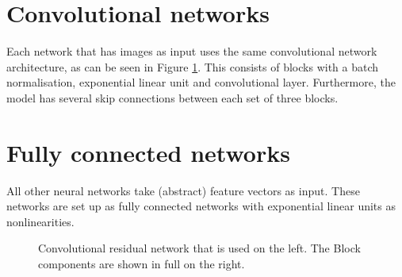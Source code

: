 \documentclass{report}
\begin{document}
\begin{appendices}
\section*{Convolutional networks}
Each network that has images as input uses the same convolutional network architecture, as can be seen in Figure \ref{fig:conv_net}. This consists of blocks with a batch normalisation, exponential linear unit and convolutional layer. Furthermore, the model has several skip connections between each set of three blocks.

\section*{Fully connected networks}
All other neural networks take (abstract) feature vectors as input. These networks are set up as fully connected networks with exponential linear units as nonlinearities.

\begin{figure}
    \centering
    
    \hspace{1cm}
    
    \caption{Convolutional residual network that is used on the left. The Block components are shown in full on the right.}
    \label{fig:conv_net}
\end{figure}


\end{appendices}
\end{document}
